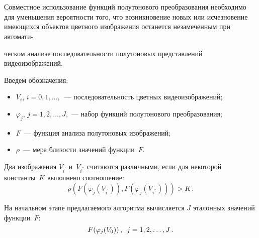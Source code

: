 \begin{multicols}{2}
\vspace*{-2pt}

\begin{figure*} %
\vspace*{6pt}
\begin{center}
\mbox{%
\epsfxsize=164.55mm
}
\end{center}
\vspace*{-9pt}
\vspace*{18pt}
\begin{center}
\mbox{%
\epsfxsize=154mm
}
\end{center}
\vspace*{-9pt}
\end{figure*}

  Совместное использование функций полутонового преобразования
необходимо для уменьшения вероятности того, что возникновение новых или
исчезновение имеющихся объектов цветного изоб\-ра\-же\-ния останется
незамеченным при автомати-\linebreak\vspace*{-12pt}

\pagebreak

\noindent
ческом анализе последовательности полутоновых
представлений видеоизображений.

  Введем обозначения:
\begin{itemize}
\item  $V_i$, $i = 0, 1, \ldots,$~--- последовательность цветных видеоизображений;
\item
  $\varphi_j$, $j = 1, 2, \ldots , J$,~--- набор функций полутонового
преобразования;
\item
  $F$~--- функция анализа полутоновых изображений;
\item
  $\rho$~--- мера близости значений функции~$F$.
  \end{itemize}

  Два изображения $V_{i^\prime}$ и~$V_{i^{\prime\prime}}$ считаются
различными, если для некоторой константы~$K$ выполнено соотношение:
  $$
  \rho (F (\varphi_j(V_{i^\prime})), F(\varphi_j(V_{i^{\prime\prime}})))>K\,.
  $$

  На начальном этапе предлагаемого алгоритма вычисляется $J$ эталонных
значений функции~$F$:
  $$
F(\varphi_j(V_0))\,,\enskip  j = 1, 2, \ldots , J\,.
$$


\end{multicols}
